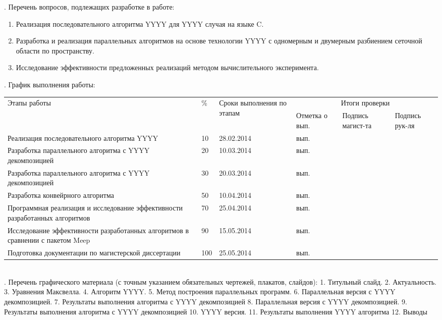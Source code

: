 . Перечень вопросов, подлежащих разработке в работе: 
    \begin{enumerate}
        \item Реализация последовательного алгоритма YYYY для YYYY случая на языке C.  
        \item Разработка и реализация параллельных алгоритмов на основе технологии YYYY с одномерным и двумерным разбиением сеточной области по пространству.
        \item Исследование эффективности предложенных реализаций методом вычислительного эксперимента.
    \end{enumerate}
\pagebreak
{}. График выполнения работы:\\
        \begin{tabular}{|p{4.7cm}|p{1cm}|p{2.5cm}|p{2cm}|p{2cm}|p{2cm}|}  \hline
        \multirow{2}{4cm}{Этапы работы}	& \multirow{2}{*}{\%} &\multirow{2}{2.5cm}{Сроки выполнения по этапам}	&\multicolumn{3}{|c|}{Итоги проверки}\\ \cline{4-6}
        &&& Отметка о вып.	&Подпись магист-та	&Подпись рук-ля\\ \hline
         Реализация последовательного алгоритма YYYY  &10	&28.02.2014	&вып.&&	\\	 \hline
        Разработка параллельного алгоритма с YYYY декомпозицией &20	&10.03.2014	&вып.&&   \\   \hline
        Разработка параллельного алгоритма с YYYY декомпозицией         &30	&20.03.2014	&вып.&&	\\	 \hline
        Разработка конвейрного алгоритма &50	&10.04.2014	&вып.&&	\\	 \hline
        Программная реализация и исследование эффективности разработанных алгоритмов  &70	&25.04.2014	&вып.&&	\\	 \hline
        Исследование эффективности разработанных алгоритмов в сравнении с пакетом Meep 	 &90	&15.05.2014	&вып.&&	\\	 \hline
        Подготовка документации по магистерской диссертации	&100	&25.05.2014	&вып. &&\\ \hline
        \end{tabular}\\[10pt]

.  Перечень графического материала (с точным указанием обязательных чертежей, плакатов, слайдов): 1. Титульный слайд. 2. Актуальность. 3. Уравнения Максвелла. 4. Алгоритм YYYY. 5. Метод построения параллельных программ. 6. Параллельная версия с YYYY декомпозицией. 7. Результаты выполнения алгоритма с YYYY декомпозицией 8. Параллельная версия с YYYY декомпозицией. 9. Результаты выполнения алгоритма с YYYY декомпозицией 10. YYYY версия. 11. Результаты выполнения YYYY алгоритма 12. Выводы\\[10pt]


